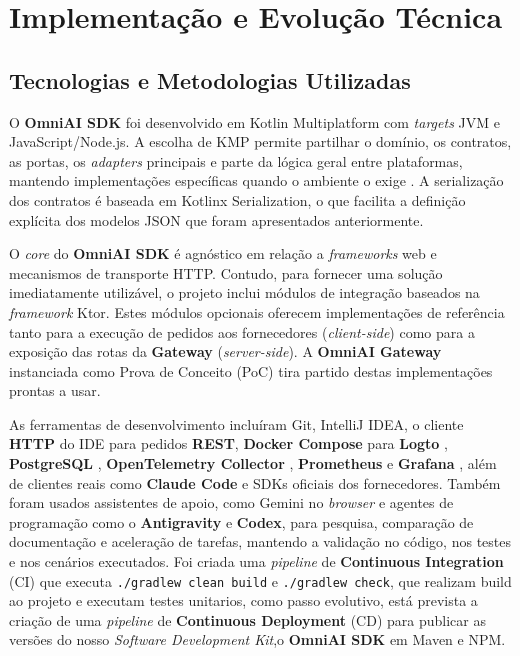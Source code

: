 
    \chapter{Implementação e Evolução Técnica}

    \section{Tecnologias e Metodologias Utilizadas}
    O \textbf{OmniAI SDK} foi desenvolvido em Kotlin Multiplatform \cite{kmp_ref} com \textit{targets} JVM e JavaScript/Node.js.
    A escolha de KMP permite partilhar o domínio, os contratos, as portas, os \textit{adapters} principais e parte da lógica geral entre plataformas, mantendo implementações específicas quando o ambiente o exige \cite{kotlin_multiplatform}. A serialização dos contratos é baseada em Kotlinx Serialization\cite{serialization_ref}, o que facilita a definição explícita dos modelos JSON que foram apresentados anteriormente.

    O \textit{core} do \textbf{OmniAI SDK} é agnóstico em relação a \textit{frameworks} web e mecanismos de transporte HTTP. Contudo, para fornecer uma solução imediatamente utilizável, o projeto inclui módulos de integração baseados na \textit{framework} Ktor\cite{ktor_ref}. Estes módulos opcionais oferecem implementações de referência tanto para a execução de pedidos aos fornecedores (\textit{client-side}) como para a exposição das rotas da \textbf{Gateway} (\textit{server-side}). A \textbf{OmniAI Gateway} instanciada como Prova de Conceito (PoC) tira partido destas implementações prontas a usar.

    As ferramentas de desenvolvimento incluíram Git, IntelliJ IDEA, o cliente \textbf{HTTP} do IDE para pedidos \textbf{REST}, \textbf{Docker Compose} para \textbf{Logto} \cite{logto_docs}, \textbf{PostgreSQL} \cite{postgresql_ref}, \textbf{OpenTelemetry Collector} \cite{opentelemetry_what_is}, \textbf{Prometheus} \cite{prometheus_ref} e \textbf{Grafana} \cite{grafana_ref}, além de clientes reais como \textbf{Claude Code} e SDKs oficiais dos fornecedores. Também foram usados assistentes de apoio, como Gemini no \textit{browser} e agentes de programação como o \textbf{Antigravity} e \textbf{Codex}, para pesquisa, comparação de documentação e aceleração de tarefas, mantendo a validação no código, nos testes e nos cenários executados. Foi criada uma \textit{pipeline} de \textbf{Continuous Integration} (CI) \cite{CI_ref}  que executa \texttt{./gradlew clean build}  e \texttt{./gradlew check}, que realizam build ao projeto e executam testes unitarios, como passo evolutivo, está prevista a criação de uma \textit{pipeline} de \textbf{Continuous Deployment} (CD) para publicar as versões do nosso \textit{Software Development Kit},o \textbf{OmniAI SDK} em Maven e NPM.

